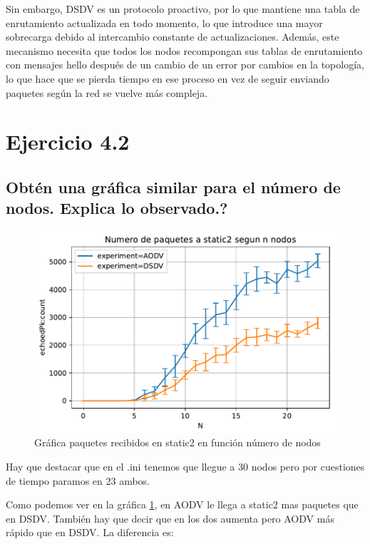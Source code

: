 Sin embargo, DSDV es un protocolo proactivo, por lo que mantiene una tabla de enrutamiento actualizada en todo momento, lo que introduce una mayor sobrecarga debido al intercambio constante de actualizaciones. Además, este mecanismo necesita que todos los nodos recompongan sus tablas de enrutamiento con mensajes hello después de un cambio de un error por cambios en la topología, lo que hace que se pierda tiempo en ese proceso en vez de seguir enviando paquetes según la red se vuelve más compleja.

\section{Ejercicio 4.2}

\subsection{Obtén una gráfica similar para el número de nodos. Explica lo observado.?}

\begin{figure}[H]
    \centering
    \includegraphics{imaxes/graficas/ejer4_2.pdf}
    \caption{Gráfica paquetes recibidos en static2 en función número de nodos}
    \label{fig:ejer4_2}
\end{figure}

Hay que destacar que en el .ini tenemos que llegue a 30 nodos pero por cuestiones de tiempo paramos en 23 ambos.

Como podemos ver en la gráfica \ref{fig:ejer4_2}, en AODV le llega a static2 mas paquetes que en DSDV. También hay que decir que en los dos aumenta pero AODV más rápido que en DSDV. La diferencia es:

